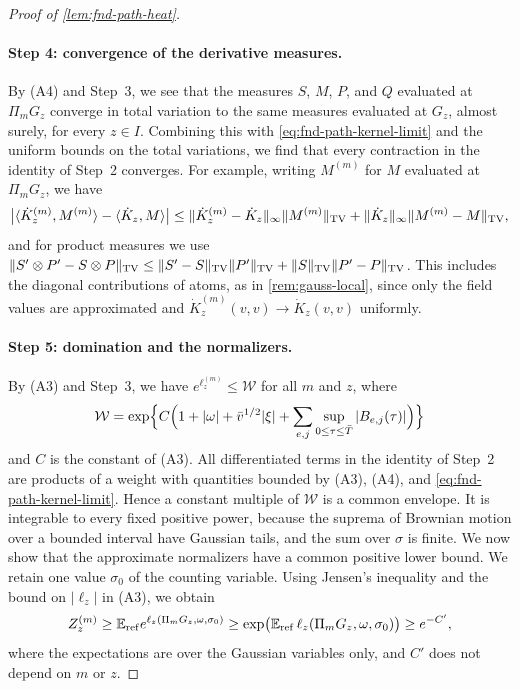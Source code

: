 \begin{proof}[Proof of \cref{lem:fnd-path-heat}]
\paragraph{Step 4: convergence of the derivative measures.}
By (A4) and Step~3, we see that the measures $S$, $M$, $P$, and $Q$
evaluated at $\Pi_mG_z$ converge in total variation to the same measures evaluated
at $G_z$, almost surely, for every $z\in I$. Combining this with
\eqref{eq:fnd-path-kernel-limit} and the uniform bounds on the total
variations, we find that every contraction in the identity of Step~2
converges. For example, writing $M^{(m)}$ for $M$ evaluated at $\Pi_mG_z$,
we have
\[
 \bigl|\langle\dot K_z^{(m)},M^{(m)}\rangle-\langle\dot K_z,M\rangle\bigr|
 \le\|\dot K_z^{(m)}-\dot K_z\|_\infty\|M^{(m)}\|_{\rm TV}
 +\|\dot K_z\|_\infty\|M^{(m)}-M\|_{\rm TV},
\]
and for product measures we use
$\|S'\otimes P'-S\otimes P\|_{\rm TV}\le\|S'-S\|_{\rm TV}\|P'\|_{\rm TV}
+\|S\|_{\rm TV}\|P'-P\|_{\rm TV}$. This includes the diagonal
contributions of atoms, as in
\cref{rem:gauss-local}, since only the field values are approximated
and $\dot K^{(m)}_z(v,v)\to\dot K_z(v,v)$ uniformly.

\paragraph{Step 5: domination and the normalizers.}
By (A3) and Step~3, we have $e^{\ell^{(m)}_z}\le\mathcal W$ for all $m$
and $z$, where
\[
 \mathcal W=\exp\Bigl\{C\Bigl(1+|\omega|+\bar v^{1/2}|\xi|
 +\sum_{e,j}\sup_{0\le\tau\le\bar T}|B_{e,j}(\tau)|\Bigr)\Bigr\}
\]
and $C$ is the constant of (A3). All differentiated terms in the
identity of Step~2 are products of a weight with quantities bounded by
(A3), (A4), and \eqref{eq:fnd-path-kernel-limit}. Hence a constant
multiple of $\mathcal W$ is a common envelope. It is integrable to every fixed
positive power, because the suprema of Brownian motion over a bounded
interval have Gaussian tails, and the sum over $\sigma$ is finite. We now
show that the approximate normalizers have a common positive
lower bound. We retain one value $\sigma_0$ of the counting variable.
Using Jensen's inequality and the bound on $|\ell_z|$ in (A3), we obtain
\[
 Z^{(m)}_z\ge\mathbb E_{\rm ref}e^{\ell_z(\Pi_mG_z,\omega,\sigma_0)}
 \ge\exp\bigl(\mathbb E_{\rm ref}\,\ell_z(\Pi_mG_z,\omega,\sigma_0)\bigr)\ge e^{-C'},
\]
where the expectations are over the Gaussian variables only, and $C'$
does not depend on $m$ or $z$.


\end{proof}
